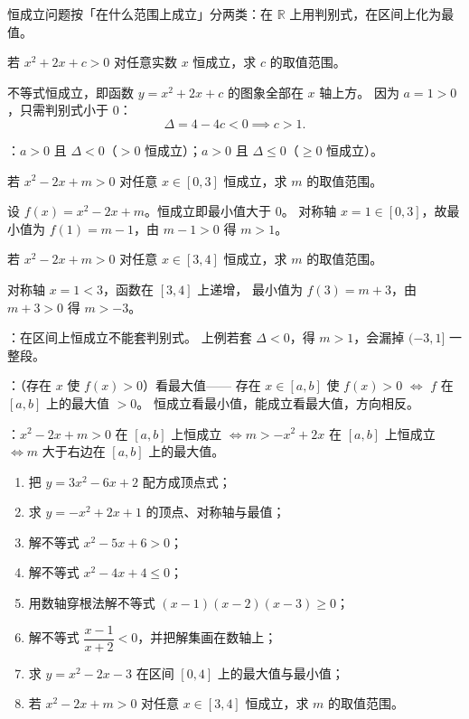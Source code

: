 \begin{explore}
恒成立问题按「在什么范围上成立」分两类：在 $\mathbb{R}$ 上用判别式，在区间上化为最值。

\begin{problem}
若 $x^2+2x+c>0$ 对任意实数 $x$ 恒成立，求 $c$ 的取值范围。
\end{problem}
\begin{solution}
不等式恒成立，即函数 $y=x^2+2x+c$ 的图象全部在 $x$ 轴上方。
因为 $a=1>0$，只需判别式小于 $0$：
\[
  \Delta=4-4c<0\implies c>1.
\]
\end{solution}

：$a>0$ 且 $\Delta<0$（$>0$ 恒成立）；$a>0$ 且 $\Delta\leq0$（$\geq0$ 恒成立）。

\begin{problem}
若 $x^2-2x+m>0$ 对任意 $x\in[0,3]$ 恒成立，求 $m$ 的取值范围。
\end{problem}
\begin{solution}
设 $f(x)=x^2-2x+m$。恒成立即最小值大于 $0$。
对称轴 $x=1\in[0,3]$，故最小值为 $f(1)=m-1$，由 $m-1>0$ 得 $m>1$。
\end{solution}

\begin{problem}
若 $x^2-2x+m>0$ 对任意 $x\in[3,4]$ 恒成立，求 $m$ 的取值范围。
\end{problem}
\begin{solution}
对称轴 $x=1<3$，函数在 $[3,4]$ 上递增，
最小值为 $f(3)=m+3$，由 $m+3>0$ 得 $m>-3$。
\end{solution}

：在区间上恒成立不能套判别式。
上例若套 $\Delta<0$，得 $m>1$，会漏掉 $(-3,1]$ 一整段。

：（存在 $x$ 使 $f(x)>0$）看最大值——
存在 $x\in[a,b]$ 使 $f(x)>0$ $\iff$ $f$ 在 $[a,b]$ 上的最大值 $>0$。
恒成立看最小值，能成立看最大值，方向相反。

：$x^2-2x+m>0$ 在 $[a,b]$ 上恒成立
$\iff m>-x^2+2x$ 在 $[a,b]$ 上恒成立 $\iff m$ 大于右边在 $[a,b]$ 上的最大值。

\end{explore}

\begin{inclasstest}
\begin{enumerate}
  \item 把 $y=3x^2-6x+2$ 配方成顶点式；
  \item 求 $y=-x^2+2x+1$ 的顶点、对称轴与最值；
  \item 解不等式 $x^2-5x+6>0$；
  \item 解不等式 $x^2-4x+4\leq0$；
  \item 用数轴穿根法解不等式 $(x-1)(x-2)(x-3)\geq0$；
  \item 解不等式 $\dfrac{x-1}{x+2}<0$，并把解集画在数轴上；
  \item 求 $y=x^2-2x-3$ 在区间 $[0,4]$ 上的最大值与最小值；
  \item 若 $x^2-2x+m>0$ 对任意 $x\in[3,4]$ 恒成立，求 $m$ 的取值范围。
\end{enumerate}
\end{inclasstest}

